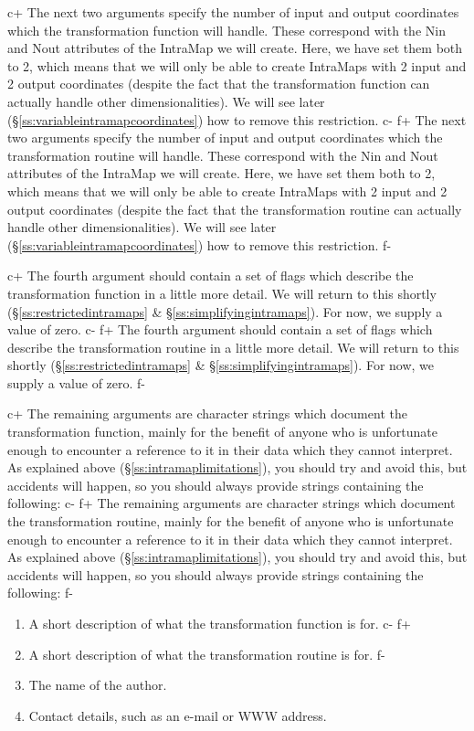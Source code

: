 \documentclass[twoside,11pt]{article}
\newcommand{\secref}[1]{\S\ref{#1}}
\newcommand{\secref}[1]{\ref{#1}}
\begin{document}
c+
The next two arguments specify the number of input and output
coordinates which the transformation function will handle. These
correspond with the Nin and Nout attributes of the IntraMap we will
create. Here, we have set them both to 2, which means that we will
only be able to create IntraMaps with 2 input and 2 output coordinates
(despite the fact that the transformation function can actually handle
other dimensionalities). We will see later
(\secref{ss:variableintramapcoordinates}) how to remove this
restriction.
c-
f+
The next two arguments specify the number of input and output
coordinates which the transformation routine will handle. These
correspond with the Nin and Nout attributes of the IntraMap we will
create. Here, we have set them both to 2, which means that we will
only be able to create IntraMaps with 2 input and 2 output coordinates
(despite the fact that the transformation routine can actually handle
other dimensionalities). We will see later
(\secref{ss:variableintramapcoordinates}) how to remove this
restriction.
f-

c+
The fourth argument should contain a set of flags which describe the
transformation function in a little more detail. We will return to
this shortly (\secref{ss:restrictedintramaps} \&
\secref{ss:simplifyingintramaps}). For now, we supply a value of zero.
c-
f+
The fourth argument should contain a set of flags which describe the
transformation routine in a little more detail. We will return to this
shortly (\secref{ss:restrictedintramaps} \&
\secref{ss:simplifyingintramaps}). For now, we supply a value of zero.
f-

c+
The remaining arguments are character strings which document the
transformation function, mainly for the benefit of anyone who is
unfortunate enough to encounter a reference to it in their data which
they cannot interpret. As explained above
(\secref{ss:intramaplimitations}), you should try and avoid this, but
accidents will happen, so you should always provide strings containing
the following:
c-
f+
The remaining arguments are character strings which document the
transformation routine, mainly for the benefit of anyone who is
unfortunate enough to encounter a reference to it in their data which
they cannot interpret. As explained above
(\secref{ss:intramaplimitations}), you should try and avoid this, but
accidents will happen, so you should always provide strings containing
the following:
f-

\begin{enumerate}
c+
\item A short description of what the transformation function is for.
c-
f+
\item A short description of what the transformation routine is for.
f-
\item The name of the author.
\item Contact details, such as an e-mail or WWW address.
\end{enumerate}
\end{document}
